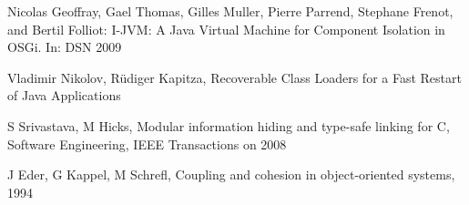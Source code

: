 \begin{thebibliography}{99}
 Nicolas Geoffray, Gael Thomas, Gilles Muller, Pierre Parrend, Stephane Frenot, and Bertil Folliot: I-JVM: A Java Virtual Machine for Component Isolation in OSGi. In: DSN 2009

 Vladimir Nikolov, Rüdiger Kapitza, Recoverable Class Loaders for a Fast Restart of
Java Applications

 S Srivastava, M Hicks, Modular information hiding and type-safe linking for C, Software Engineering, IEEE Transactions on 2008

 J Eder, G Kappel, M Schrefl, Coupling and cohesion in object-oriented systems, 1994
 

\end{thebibliography}